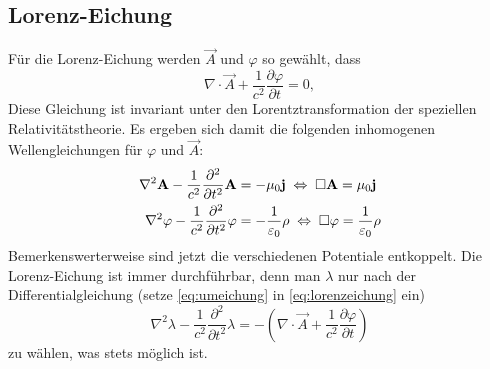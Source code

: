 \subsection{Lorenz-Eichung}

Für die Lorenz-Eichung werden $\vec {A}$ und $\varphi $ so gewählt, dass
\begin{equation}
    \label{eq:lorenzeichung}
	\nabla \cdot \vec {A}+\frac{1}{c^{2}}\frac{\partial \varphi }{\partial t}=0,
\end{equation}
Diese Gleichung ist invariant unter den Lorentztransformation der speziellen Relativitätstheorie. Es ergeben sich damit die folgenden inhomogenen Wellengleichungen für $\varphi $ und $\vec {A}$:
\begin{align*}
	\nabla ^{2}\mathbf{A}-\frac{1}{c^{2}}\frac{\partial ^{2}}{\partial t^{2}}\mathbf{A}&=-\mu _{0}\mathbf{j}\;\Leftrightarrow\; \Box \mathbf{A}=\mu _{0}\mathbf{j} \\
	\nabla ^{2}\varphi -\frac{1}{c^{2}}\frac{\partial ^{2}}{\partial t^{2}}\varphi &=-\frac{1}{\varepsilon _{0}}\rho \;\Leftrightarrow\; \Box \varphi =\frac{1}{\varepsilon _{0}}\rho
\end{align*}
Bemerkenswerterweise sind jetzt die verschiedenen Potentiale entkoppelt. Die Lorenz-Eichung ist immer durchführbar, denn man $\lambda $ nur nach der Differentialgleichung (setze \eqref{eq:umeichung} in \eqref{eq:lorenzeichung} ein)
\begin{equation*}
	\nabla ^{2}\lambda -\frac{1}{c^{2}}\frac{\partial ^{2}}{\partial t^{2}}\lambda =-\left(\nabla \cdot \vec {A}+\frac{1}{c^{2}}\frac{\partial \varphi }{\partial t}\right)
\end{equation*}
zu wählen, was stets möglich ist.

